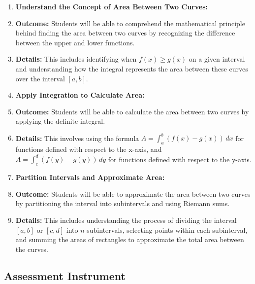 \begin{enumerate}
    \item \textbf{Understand the Concept of Area Between Two Curves:}
    \item \textbf{Outcome:} Students will be able to comprehend the mathematical principle behind finding the area between two curves by recognizing the difference between the upper and lower functions.
    \item \textbf{Details:} This includes identifying when $f(x) \geq g(x)$ on a given interval and understanding how the integral represents the area between these curves over the interval $[a, b]$.
    \item \textbf{Apply Integration to Calculate Area:}
    \item \textbf{Outcome:} Students will be able to calculate the area between two curves by applying the definite integral.
    \item \textbf{Details:} This involves using the formula $A = \int _a^b (f(x) - g(x)) \, dx$ for functions defined with respect to the x-axis, and $A = \int _c^d (f(y) - g(y)) \, dy$ for functions defined with respect to the y-axis.
    \item \textbf{Partition Intervals and Approximate Area:}
    \item \textbf{Outcome:} Students will be able to approximate the area between two curves by partitioning the interval into subintervals and using Riemann sums.
    \item \textbf{Details:} This includes understanding the process of dividing the interval $[a, b]$ or $[c, d]$ into $n$ subintervals, selecting points within each subinterval, and summing the areas of rectangles to approximate the total area between the curves.
\end{enumerate}

\subsection{Assessment Instrument}

